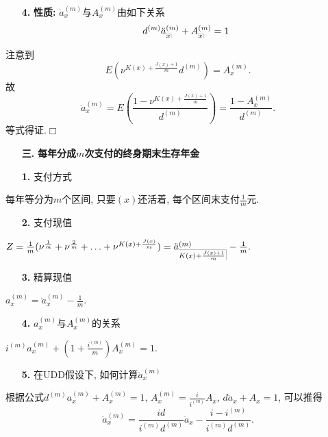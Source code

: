 \documentclass[a4paper,openany, 10pt]{ctexbook}
\makeatletter
\newcommand{\hei}{\CJKfamily{hei}}      %
\def\qed{\hfill$\Box$\medskip}
\def\z{\left}
\def\y{\right}
\DeclareRobustCommand{\annu}[1]{_{%
    \def\arraystretch{0}%
    \setlength\arraycolsep{1pt}%
    \setlength\arrayrulewidth{.2pt}%
    \begin{array}[b]{@{}c|}\hline
        \\[\arraycolsep]%
        \scriptstyle #1%
    \end{array}%
}}
\makeatother
\begin{document}
\begin{itemize}
    \item [{\bf\hei 4.}] {\heiti\bf 性质:} $\ddot a_{x}^{(m)}$与$A_{{x}}^{(m)}$由如下关系
    $$d^{(m)}\ddot a_{\annu{x}}^{(m)} + A_{\annu{x}}^{(m)} = 1$$
\end{itemize}

\proof 注意到 $$E\z(\nu^{K(x)+\frac{J(x)+1}{m}}{d^{(m)}}\y)=A_x^{(m)}.$$ 故
$$\ddot a_{{x}}^{(m)} = E(\frac{1-\nu^{K(x)+\frac{J(x)+1}{m}}}{d^{(m)}}) = \frac{1-A_x^{(m)}}{d^{(m)}}.$$
等式得证.\qed

\begin{itemize}
    \item[{\bf\hei 三.}]{\bf\hei 每年分成$m$次支付的终身期末生存年金}
\end{itemize}

\begin{itemize}
    \item[{\bf\hei 1.}] 支付方式
\end{itemize}

每年等分为$m$个区间, 只要$(x)$还活着, 每个区间末支付$\frac1m$元.

\begin{itemize}
    \item[{\bf\hei 2.}] 支付现值
\end{itemize}

$Z = \frac1m(\nu^{\frac1m} + \nu^{\frac2m} + \ldots + \nu^{K(x)+\frac{J(x)}{m}}) = \ddot a_{\annu{K(x)+\frac{J(x)+1}{m}}}^{(m)} - \frac1m.$

\begin{itemize}
    \item [{\bf\hei 3.}] 精算现值
\end{itemize}

$a_x^{(m)} = \ddot a_x^{(m)} - \frac1m.$

\begin{itemize}
    \item[{\bf\hei 4.}] $a_{x}^{(m)}$与$A_{x}^{(m)}$的关系
\end{itemize}

$i^{(m)}a_{x}^{(m)} + (1+\frac{i^{(m)}}m)A_{x}^{(m)} = 1.$

\begin{itemize}
    \item[{\bf\hei 5.}] 在UDD假设下, 如何计算$\ddot a_{x}^{(m)}$
\end{itemize}

根据公式$d^{(m)}a_x^{(m)} + A_x^{(m)} = 1$, $A_x^{(m)} = \frac{i}{i^{(m)}}A_x$, $d \ddot a_x + A_x = 1$, 可以推得$$\ddot a_x^{(m)} = \frac{id}{i^{(m)}d^{(m)}}\ddot a_x - \frac{i - i^{(m)}}{i^{(m)}d^{(m)}}.$$
\end{document}
